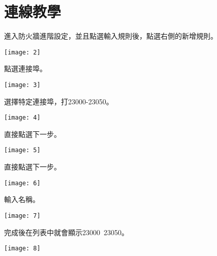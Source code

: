 \chapter{連線教學}
進入防火牆進階設定，並且點選輸入規則後，點選右側的新增規則。\\

\begin{minipage}{\textwidth}
  \centering
  \texttt{[image: 2]}
  \label{連線教學步驟一}
\end{minipage}

點選連接埠。\\

\begin{minipage}{\textwidth}
  \centering
  \texttt{[image: 3]}
  \label{連線教學步驟二}
\end{minipage}

選擇特定連接埠，打23000-23050。\\

\begin{minipage}{\textwidth}
  \centering
  \texttt{[image: 4]}
  \label{連線教學步驟三}
\end{minipage}

直接點選下一步。\\

\begin{minipage}{\textwidth}
  \centering
  \texttt{[image: 5]}
  \label{連線教學步驟四}
\end{minipage}

直接點選下一步。\\

\begin{minipage}{\textwidth}
  \centering
  \texttt{[image: 6]}
  \label{連線教學步驟五}
\end{minipage}

輸入名稱。\\

\begin{minipage}{\textwidth}
  \centering
  \texttt{[image: 7]}
  \label{連線教學步驟六}
\end{minipage}

完成後在列表中就會顯示23000~23050。\\

\begin{minipage}{\textwidth}
  \centering
  \texttt{[image: 8]}
  \label{連線教學步驟七}
\end{minipage}
\newpage
